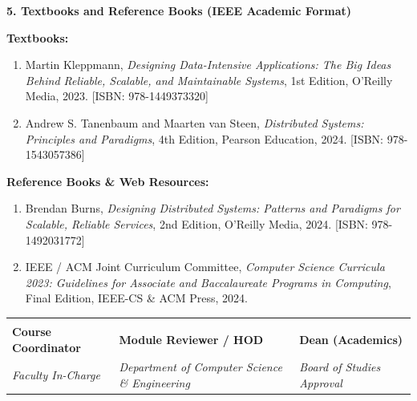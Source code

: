 \documentclass[10pt,a4paper]{article}
\begin{document}
\vspace{6pt}
{\large\textbf{\color{nbaNavy}5. Textbooks and Reference Books (IEEE Academic Format)}}

\textbf{Textbooks:}
\begin{enumerate}
    \item Martin Kleppmann, \textit{Designing Data-Intensive Applications: The Big Ideas Behind Reliable, Scalable, and Maintainable Systems}, 1st Edition, O'Reilly Media, 2023. [ISBN: 978-1449373320]    \item Andrew S. Tanenbaum and Maarten van Steen, \textit{Distributed Systems: Principles and Paradigms}, 4th Edition, Pearson Education, 2024. [ISBN: 978-1543057386]\end{enumerate}

\textbf{Reference Books \& Web Resources:}
\begin{enumerate}
    \item Brendan Burns, \textit{Designing Distributed Systems: Patterns and Paradigms for Scalable, Reliable Services}, 2nd Edition, O'Reilly Media, 2024. [ISBN: 978-1492031772]    \item IEEE / ACM Joint Curriculum Committee, \textit{Computer Science Curricula 2023: Guidelines for Associate and Baccalaureate Programs in Computing}, Final Edition, IEEE-CS \& ACM Press, 2024.\end{enumerate}

\vspace{18pt}
\begin{table}[h!]
\centering
\begin{tabularx}{\textwidth}{Z Z Z}
\toprule
\vspace{25pt} & \vspace{25pt} & \vspace{25pt} \\
\textbf{Course Coordinator} & \textbf{Module Reviewer / HOD} & \textbf{Dean (Academics)} \\
\textit{Faculty In-Charge} & \textit{Department of Computer Science \& Engineering} & \textit{Board of Studies Approval} \\
\bottomrule
\end{tabularx}
\end{table}
\end{document}
